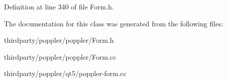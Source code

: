 Definition at line 340 of file Form.\+h.



The documentation for this class was generated from the following files\+:\begin{DoxyCompactItemize}
\item 
thirdparty/poppler/poppler/Form.\+h\item 
thirdparty/poppler/poppler/Form.\+cc\item 
thirdparty/poppler/qt5/poppler-\/form.\+cc\end{DoxyCompactItemize}
